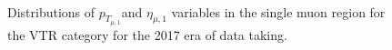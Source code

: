 \begin{figure}[htbp]
  \centering
    \\
  \caption{Distributions of $p_{T_{\mu,1}}$and $\eta_{\mu,1}$ variables in the single muon region for the VTR category for the 2017 era of data taking.}
  \label{app:2017_Wmunu_1}
\end{figure}
\newpage

